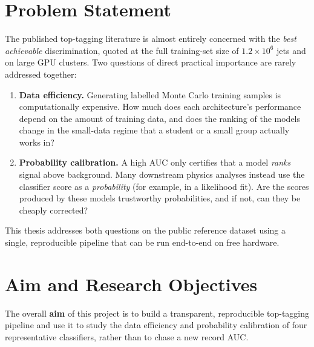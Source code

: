 \section{Problem Statement}
\label{sec:problem_statement}

The published top-tagging literature is almost entirely concerned with the
\emph{best achievable} discrimination, quoted at the full training-set size
of $1.2\times10^{6}$ jets and on large GPU clusters. Two questions of direct
practical importance are rarely addressed together:

\begin{enumerate}
    \item \textbf{Data efficiency.} Generating labelled Monte Carlo training
    samples is computationally expensive. How much does each architecture's
    performance depend on the amount of training data, and does the ranking
    of the models change in the small-data regime that a student or a small
    group actually works in?
    \item \textbf{Probability calibration.} A high AUC only certifies that a
    model \emph{ranks} signal above background. Many downstream physics
    analyses instead use the classifier score as a \emph{probability} (for
    example, in a likelihood fit). Are the scores produced by these models
    trustworthy probabilities, and if not, can they be cheaply corrected?
\end{enumerate}

This thesis addresses both questions on the public reference dataset using a
single, reproducible pipeline that can be run end-to-end on free hardware.

\section{Aim and Research Objectives}
\label{sec:objectives}

The overall \textbf{aim} of this project is to build a transparent,
reproducible top-tagging pipeline and use it to study the data efficiency
and probability calibration of four representative classifiers, rather than
to chase a new record AUC.

